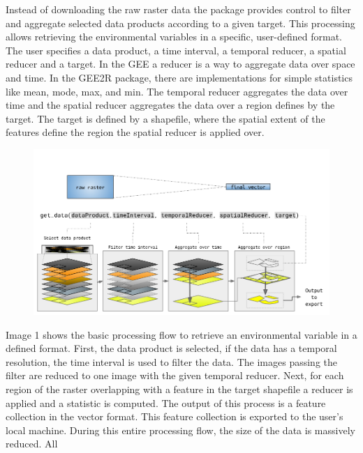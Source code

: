 \documentclass[12pt,twoside,a4paper,final]{report}
\begin{document}
Instead of downloading the raw raster data the package provides control to filter and aggregate selected data products according to a given target. This processing allows retrieving the environmental variables in a specific, user-defined format. The user specifies a data product,  a time interval, a temporal reducer, a spatial reducer and a target. In the GEE a reducer is a way to aggregate data over space and time. In the GEE2R package, there are implementations for simple statistics like mean, mode, max, and min. The temporal reducer aggregates the data over time and the spatial reducer aggregates the data over a region defines by the target. 
The target is defined by a shapefile, where the spatial extent of the features define the region the spatial reducer is applied over.

\begin{center}

   \begin{figure}[h]
     \begin{center}
       \includegraphics[width=15cm]{images/design_function.pdf}
    \end{center}
  \end{figure}
\end{center}

Image 1 shows the basic processing flow to retrieve an environmental variable in a defined format. First, the data product is selected, if the data has a temporal resolution, the time interval is used to filter the data. The images passing the filter are reduced to one image with the given temporal reducer. Next, for each region of the raster overlapping with a feature in the target shapefile a reducer is applied and a statistic is computed. The output of this process is a feature collection in the vector format. This feature collection is exported to the user's local machine.
During this entire processing flow, the size of the data is massively reduced. All 
\end{document}
